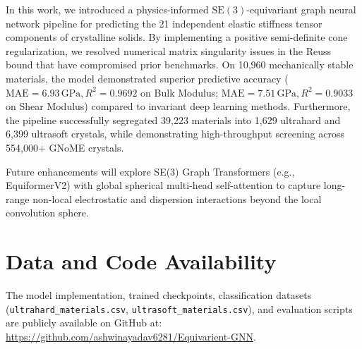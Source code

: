 \documentclass[twocolumn,10pt,aps,prb,superscriptaddress,floatfix]{revtex4-2}
\begin{document}
In this work, we introduced a physics-informed $\mathrm{SE}(3)$-equivariant graph neural network pipeline for predicting the 21 independent elastic stiffness tensor components of crystalline solids. By implementing a positive semi-definite cone regularization, we resolved numerical matrix singularity issues in the Reuss bound that have compromised prior benchmarks. On 10,960 mechanically stable materials, the model demonstrated superior predictive accuracy ($\mathrm{MAE} = 6.93\,\mathrm{GPa}, R^2 = 0.9692$ on Bulk Modulus; $\mathrm{MAE} = 7.51\,\mathrm{GPa}, R^2 = 0.9033$ on Shear Modulus) compared to invariant deep learning methods. Furthermore, the pipeline successfully segregated 39,223 materials into 1,629 ultrahard and 6,399 ultrasoft crystals, while demonstrating high-throughput screening across 554,000+ GNoME crystals.

Future enhancements will explore SE(3) Graph Transformers (e.g., EquiformerV2) with global spherical multi-head self-attention to capture long-range non-local electrostatic and dispersion interactions beyond the local convolution sphere.

\section*{Data and Code Availability}
The model implementation, trained checkpoints, classification datasets (\texttt{ultrahard\_materials.csv}, \texttt{ultrasoft\_materials.csv}), and evaluation scripts are publicly available on GitHub at: \\
\url{https://github.com/ashwinayadav6281/Equivarient-GNN}.
\end{document}
